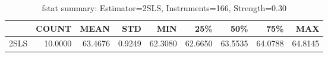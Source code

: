\begin{table}[ht]
\centering
\caption{fstat summary: Estimator=2SLS, Instruments=166, Strength=0.30}
\begin{tabular}{lrrrrrrrr}
\toprule
 & COUNT & MEAN & STD & MIN & 25\% & 50\% & 75\% & MAX \\
\midrule
2SLS & 10.0000 & 63.4676 & 0.9249 & 62.3080 & 62.6650 & 63.5535 & 64.0788 & 64.8145 \\
\bottomrule
\end{tabular}
\end{table}

